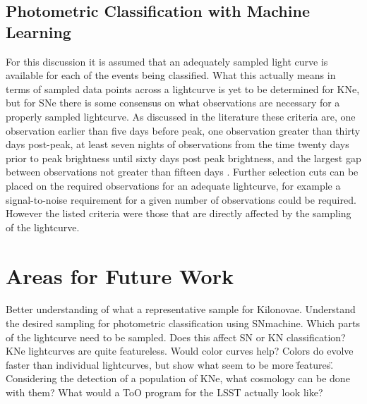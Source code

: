 \documentclass[12pt]{article}
\begin{document}
\subsection{Photometric Classification with Machine Learning} %
For this discussion it is assumed that an adequately sampled light curve is available for each of the events being classified. What this actually means in terms of sampled data points across a lightcurve is yet to be determined for KNe, but for SNe there is some consensus on what observations are necessary for a properly sampled lightcurve. As discussed in the literature these criteria are, one observation earlier than five days before peak, one observation greater than thirty days post-peak, at least seven nights of observations from the time twenty days prior to peak brightness until sixty days post peak brightness, and the largest gap between observations not greater than fifteen days \citep{LSSTScienceCollaboration2017}. Further selection cuts can be placed on the required observations for an adequate lightcurve, for example a signal-to-noise requirement for a given number of observations could be required. However the listed criteria were those that are directly affected by the sampling of the lightcurve.
\section{Areas for Future Work} %
Better understanding of what a representative sample for Kilonovae.
Understand the desired sampling for photometric classification using SNmachine. Which parts of the lightcurve need to be sampled. Does this affect SN or KN classification?
KNe lightcurves are quite featureless. Would color curves help? Colors do evolve faster than individual lightcurves, but show what seem to be more \"features\".
Considering the detection of a population of KNe, what cosmology can be done with them?
What would a ToO program for the LSST actually look like?



\end{document}
